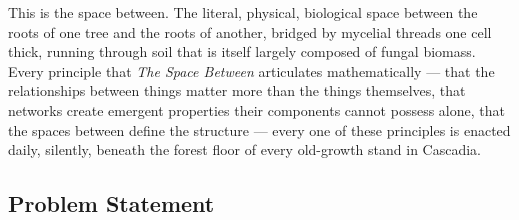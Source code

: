 \documentclass[11pt,letterpaper]{article}
\begin{document}
This is the space between. The literal, physical, biological space between the roots of one tree and the roots of another, bridged by mycelial threads one cell thick, running through soil that is itself largely composed of fungal biomass. Every principle that \textit{The Space Between} articulates mathematically --- that the relationships between things matter more than the things themselves, that networks create emergent properties their components cannot possess alone, that the spaces between define the structure --- every one of these principles is enacted daily, silently, beneath the forest floor of every old-growth stand in Cascadia.

\subsection{Problem Statement}
\end{document}
